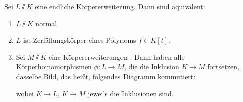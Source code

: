 \documentclass[12pt,a4paper]{scrartcl}
\begin{document}
\begin{satz}[Normalität] Sei $L\sslash K$ eine endliche Körpererweiterung. Dann sind äquivalent:
\begin{enumerate}
	\item $L\sslash K$ normal
	\item $L$ ist Zerfällungskörper eines Polynoms $f\in K[t]$.
	\item Sei $M\sslash K$ eine Körpererweiterungen . Dann haben alle Körperhomomorphismen $\phi\colon L\to M$, die die Inklusion $K\to M$ fortsetzen, dasselbe Bild, das heißt, folgendes Diagramm kommutiert:
	wobei $K\to L$, $K\to M$ jeweils die Inklusionen sind.
\end{enumerate}
\end{satz}

\end{document}
